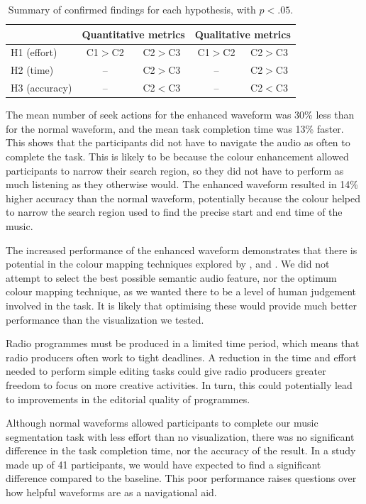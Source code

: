 \begin{table}[h]
  \centering
  \begin{tabular}{l | c c | c c}
    \hline
    & \multicolumn{2}{c|}{Quantitative metrics} & \multicolumn{2}{c}{Qualitative metrics} \\
    \hline
    H1 (effort)   & C1$>$C2 & C2$>$C3 & C1$>$C2 & C2$>$C3 \\
    H2 (time)     & --      & C2$>$C3 & --      & C2$>$C3 \\
    H3 (accuracy) & --      & C2$<$C3 & --      & C2$<$C3 \\
    \hline
  \end{tabular}
  \caption{Summary of confirmed findings for each hypothesis, with $p<.05$.}
  \label{tab:hypotheses}
\end{table}

The mean number of seek actions for the enhanced waveform was 30\% less than for the normal waveform, and the mean task
completion time was 13\% faster. This shows that the participants did not have to navigate the audio as often to
complete the task. This is likely to be because the colour enhancement allowed participants to narrow their search
region, so they did not have to perform as much listening as they otherwise would. The enhanced waveform resulted in
14\% higher accuracy than the normal waveform, potentially because the colour helped to narrow the search region used
to find the precise start and end time of the music.

The increased performance of the enhanced waveform demonstrates that there is potential in the colour mapping
techniques explored by \citet{Tzanetakis2000}, \citet{Rice2005} and \citet{Mason2007}. We did not attempt to select the
best possible semantic audio feature, nor the optimum colour mapping technique, as we wanted there to be a level of
human judgement involved in the task. It is likely that optimising these would provide much better performance than the
visualization we tested.

Radio programmes must be produced in a limited time period, which means that radio producers often work to tight
deadlines. A reduction in the time and effort needed to perform simple editing tasks could give radio producers greater
freedom to focus on more creative activities. In turn, this could potentially lead to improvements in the editorial
quality of programmes.

Although normal waveforms allowed participants to complete our music segmentation task with less effort than no
visualization, there was no significant difference in the task completion time, nor the accuracy of the result.  In a
study made up of 41 participants, we would have expected to find a significant difference compared to the baseline.
This poor performance raises questions over how helpful waveforms are as a navigational aid.

